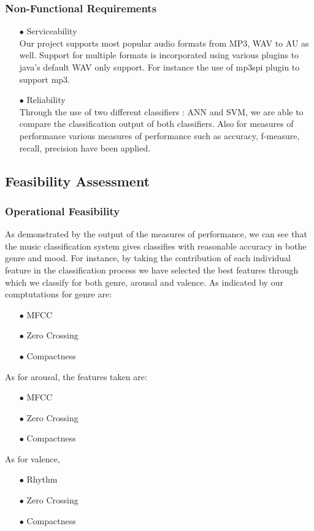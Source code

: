 \subsubsection{Non-Functional Requirements}
    \begin{itemize}
    \item[$\bullet$] Serviceability\\
        Our project supports most popular audio formats from MP3, WAV to AU as well. Support for multiple formats is incorporated using various plugins to java’s default WAV only support. For instance the use of mp3spi plugin to
         support mp3.
    \item[$\bullet$] Reliability\\
        Through the use of two different classifiers : ANN and SVM, we are able to compare the classification output of both classifiers. Also for measures of performance various measures of performance such as
        accuracy, f-measure, recall, precision have been applied.
    \end{itemize}

\subsection{Feasibility Assessment}
\subsubsection{Operational Feasibility}
    As demonstrated by the output of the measures of performance, we can see that the music classification system gives classifies with reasonable accuracy in bothe genre and mood. For instance, by taking the contribution of each
    individual feature in the classification process we have selected the best features through which we classify for both genre, arousal and valence. As indicated by our comptutations for genre are:
    \begin{itemize}
    \item[$\bullet$] MFCC
    \item[$\bullet$] Zero Crossing
    \item[$\bullet$] Compactness
    \end{itemize}
    As for arousal, the features taken are:
    \begin{itemize}
    \item[$\bullet$] MFCC
    \item[$\bullet$] Zero Crossing
    \item[$\bullet$] Compactness
    \end{itemize}
    As for valence,
    \begin{itemize}
    \item[$\bullet$] Rhythm
    \item[$\bullet$] Zero Crossing
    \item[$\bullet$] Compactness
    \end{itemize}
\newpage
